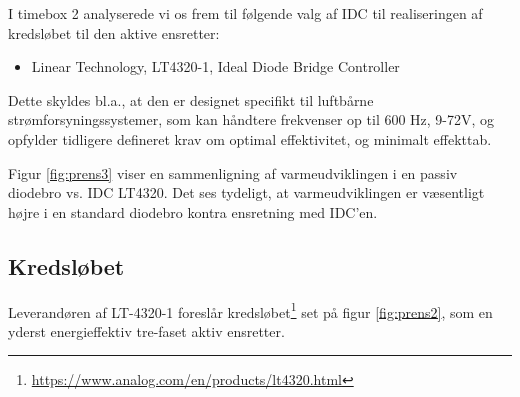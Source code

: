 I timebox 2 analyserede vi os frem til følgende valg af IDC til realiseringen af kredsløbet til den aktive ensretter:
\begin{itemize}
\item Linear Technology, LT4320-1, Ideal Diode Bridge Controller
\end{itemize}

Dette skyldes bl.a., at den er designet specifikt til luftbårne strømforsyningssystemer, som kan håndtere frekvenser op til 600 Hz, 9-72V, og opfylder tidligere defineret krav om optimal effektivitet, og minimalt effekttab.


Figur \ref{fig:prens3} viser en sammenligning af varmeudviklingen i en passiv diodebro vs. IDC LT4320. Det ses tydeligt, at varmeudviklingen er væsentligt højre i en standard diodebro kontra ensretning med IDC'en.  
\clearpage
\subsection{Kredsløbet}
\label{sec:kredslobet}

Leverandøren af LT-4320-1 foreslår kredsløbet\footnote{\url{https://www.analog.com/en/products/lt4320.html}} set på figur \ref{fig:prens2}, som en yderst energieffektiv tre-faset aktiv ensretter.

